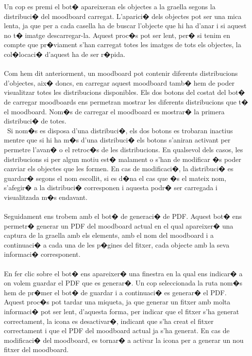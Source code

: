 \documentclass[12pt,a4paper,openright,oneside]{article}
\numberwithin{equation}{section}
\theoremstyle{definition}
\begin{document}
Un cop es premi el bot� apareixeran els objectes a la graella segons la distribuci� del moodboard carregat. L'aparici� dels objectes pot ser una mica lenta, ja que per a cada casella ha de buscar l'objecte que hi ha d'anar i si aquest no t� imatge descarregar-la. Aquest proc�s pot ser lent, per� si tenim en compte que pr�viament s'han carregat totes les imatges de tots els objectes, la col�locaci� d'aquest ha de ser r�pida. \\\\
Com hem dit anteriorment, un moodboard pot contenir diferents distribucions d'objectes, aix� doncs, en carregar aquest moodboard tamb� hem de poder visualitzar totes les distribucions disponibles. Els dos botons del costat del bot� de carregar moodboards ens permetran mostrar les diferents distribucions que t� el moodboard. Nom�s de carregar el moodboard es mostrar� la primera distribuci� de totes. \\\
Si nom�s es disposa d'una distribuci�, els dos botons es trobaran inactius mentre que si hi ha m�s d'una distribuci� els botons s'aniran activant per permetre l'avan� o el retroc�s de les distribucions. En qualsevol dels casos, les distribucions si per algun motiu est� malament o s'han de modificar �s poder canviar els objectes que les formen. En cas de modificaci�, la distribuci� es guardar� segons el nom escollit, si es d�na el cas que �s el mateix nom, s'afegir� a la distribuci� corresponen i aquesta podr� ser carregada i visualitzada m�s endavant.
\\\\
Seguidament ens trobem amb el bot� de generaci� de PDF. Aquest bot� ens permetr� generar un PDF del moodboard actual en el qual apareixer� una captura de la graella amb els elements, amb el nom del moodboard i a continuaci� a cada una de les p�gines del fitxer, cada objecte amb la seva informaci� corresponent. \\\\
En fer clic sobre el bot� ens apareixer� una finestra en la qual ens indicar� a on volem guardar el PDF que es generar�. Un cop seleccionada la ruta nom�s hem de pr�mer el bot� de guardar i a continuaci� es generar� el PDF. Aquest proc�s pot tardar una miqueta, ja que generar un fitxer amb molta informaci� pot ser lent, d'aquesta forma, per indicar que el fitxer s'ha generat correctament, la icona es desactivar�, indicant que s'ha creat el fitxer correctament i que el PDF del moodboard actual ja s'ha generat. En cas de modificaci� del moodboard, es tornar� a activar la icona per a generar un nou fitxer del moodboard.
\end{document}
